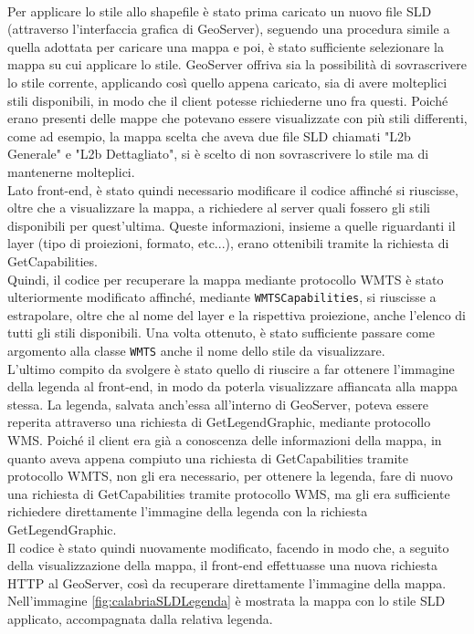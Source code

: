 \\Per applicare lo stile allo shapefile è stato prima caricato un nuovo file SLD (attraverso l'interfaccia grafica di GeoServer), seguendo una procedura simile a quella adottata per caricare una mappa e poi, è stato sufficiente selezionare la mappa su cui applicare lo stile. GeoServer offriva sia la possibilità di sovrascrivere lo stile corrente, applicando così quello appena caricato, sia di avere molteplici stili disponibili, in modo che il client potesse richiederne uno fra questi. Poiché erano presenti delle mappe che potevano essere visualizzate con più stili differenti, come ad esempio, la mappa scelta che aveva due file SLD chiamati "L2b Generale" e "L2b Dettagliato", si è scelto di non sovrascrivere lo stile ma di mantenerne molteplici.
\\Lato front-end, è stato quindi necessario modificare il codice affinché si riuscisse, oltre che a visualizzare la mappa, a richiedere al server quali fossero gli stili disponibili per quest'ultima. Queste informazioni, insieme a quelle riguardanti il layer (tipo di proiezioni, formato, etc...), erano ottenibili tramite la richiesta di GetCapabilities.
\\Quindi, il codice per recuperare la mappa mediante protocollo WMTS è stato ulteriormente modificato affinché, mediante \verb|WMTSCapabilities|, si riuscisse a estrapolare, oltre che al nome del layer e la rispettiva proiezione, anche l'elenco di tutti gli stili disponibili. Una volta ottenuto, è stato sufficiente passare come argomento alla classe \verb|WMTS| anche il nome dello stile da visualizzare.
\medskip
\\L'ultimo compito da svolgere è stato quello di riuscire a far ottenere l'immagine della legenda al front-end, in modo da poterla visualizzare affiancata alla mappa stessa. La legenda, salvata anch'essa all'interno di GeoServer, poteva essere reperita attraverso una richiesta di GetLegendGraphic, mediante protocollo WMS. Poiché il client era già a conoscenza delle informazioni della mappa, in quanto aveva appena compiuto una richiesta di GetCapabilities tramite protocollo WMTS, non gli era necessario, per ottenere la legenda, fare di nuovo una richiesta di GetCapabilities tramite protocollo WMS, ma gli era sufficiente richiedere direttamente l'immagine della legenda con la richiesta GetLegendGraphic.
\\Il codice è stato quindi nuovamente modificato, facendo in modo che, a seguito della visualizzazione della mappa, il front-end effettuasse una nuova richiesta HTTP al GeoServer, così da recuperare direttamente l'immagine della mappa. Nell'immagine \ref{fig:calabriaSLDLegenda} è mostrata la mappa con lo stile SLD applicato, accompagnata dalla relativa legenda.

